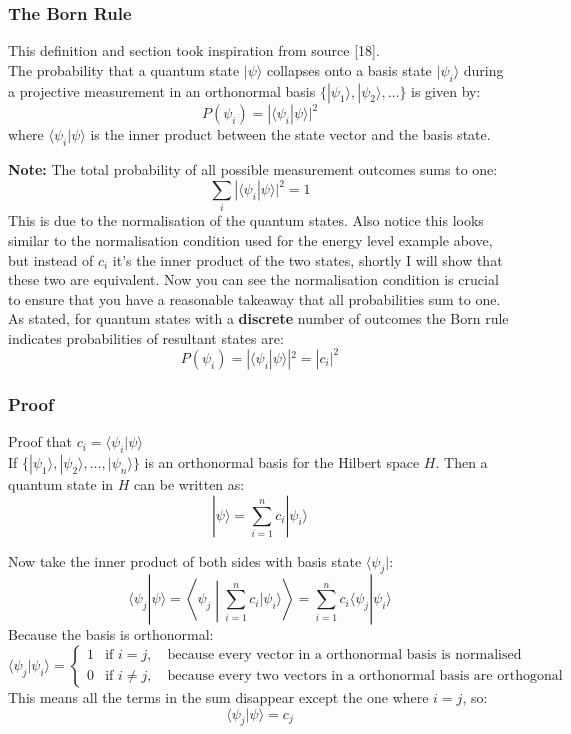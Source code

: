 \subsubsection{The Born Rule}
This definition and section took inspiration from source [18].\\
The probability that a quantum state \( |\psi\rangle \) collapses onto a basis state \( |\psi_i\rangle \) during a projective measurement in an orthonormal basis \( \{|\psi_1\rangle, |\psi_2\rangle, \dots\} \) is given by:
\begin{equation}
P(\psi_i) = |\langle \psi_i | \psi \rangle|^2
\end{equation}
where \( \langle \psi_i | \psi \rangle \) is the inner product between the state vector and the basis state.

\noindent \textbf{Note:} The total probability of all possible measurement outcomes sums to one:
    \begin{equation}
    \sum_i |\langle \psi_i | \psi \rangle|^2 = 1
    \end{equation}
This is due to the normalisation of the quantum states. Also notice this looks similar to the normalisation condition used for the energy level example above, but instead of \( c_i\) it's the inner product of the two states, shortly I will show that these two are equivalent. Now you can see the normalisation condition is crucial to ensure that you have a reasonable takeaway that all probabilities sum to one. \\


\noindent As stated, for quantum states with a \textbf{discrete} number of outcomes the Born rule indicates probabilities of resultant states are:
\begin{equation}
P(\psi_i) =  |\langle \psi_i | \psi \rangle|^2 =| c_i|^2
\end{equation}

\subsubsection{Proof}
Proof that \(c_i = \langle \psi_i | \psi \rangle\)\\
\noindent If \( \{ |\psi_1\rangle, |\psi_2\rangle, \dots, |\psi_n\rangle \} \) is an orthonormal basis for the Hilbert space $H$. Then a quantum state in $H$ can be written as:
\[
|\psi\rangle = \sum_{i=1}^n c_i |\psi_i\rangle
\]

\noindent Now take the inner product of both sides with basis state \( \langle \psi_j | \):
\[
\langle \psi_j | \psi \rangle = \left\langle \psi_j \middle| \sum_{i=1}^n c_i |\psi_i\rangle \right\rangle = \sum_{i=1}^n c_i \langle \psi_j | \psi_i \rangle
\]
Because the basis is orthonormal:
\[
\langle \psi_j | \psi_i \rangle  =
\begin{cases}
1 & \text{if } i = j, \quad \text{because every vector in a orthonormal basis is normalised}\\
0 & \text{if } i \neq j,  \quad \text{because every two vectors in a orthonormal basis are orthogonal}
\end{cases}
\]
This means all the terms in the sum disappear except the one where \( i = j \), so:
\[
\langle \psi_j | \psi \rangle = c_j
\]

